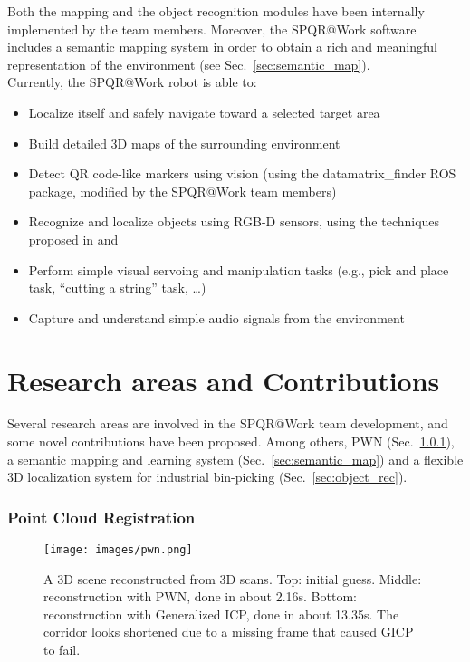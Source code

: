 \documentclass[conference]{IEEEtran}
\begin{document}
Both the mapping and the object recognition modules have been internally implemented by the team members.
Moreover, the SPQR@Work software includes a semantic mapping system in order to obtain a rich and meaningful representation of the environment (see Sec.~\ref{sec:semantic_map}).\\

Currently, the SPQR@Work robot is able to:

\begin{itemize}
 \item Localize itself and safely navigate toward a selected target area
 \item Build detailed 3D maps of the surrounding environment
 \item Detect QR code-like markers using vision (using the datamatrix\_finder ROS package, modified by the SPQR@Work team members)
 \item Recognize and localize objects using RGB-D sensors, using the techniques proposed in \cite{antonelloVISIGRAPP2014} and \cite{prettoCASE2013}
 \item Perform simple visual servoing and manipulation tasks (e.g., pick and place task, ``cutting a string'' task, \dots)
 \item Capture and understand simple audio signals from the environment
\end{itemize}

 
\section{Research areas and Contributions}\label{sec:research}

Several research areas are involved in the SPQR@Work team development, and some novel contributions have been proposed. Among others, PWN (Sec.~\ref{sec:pwn}), a semantic mapping and learning system (Sec.~\ref{sec:semantic_map}) and a flexible 3D localization system for industrial bin-picking (Sec.~\ref{sec:object_rec}).

\subsubsection{Point Cloud Registration}\label{sec:pwn}

\begin{figure}[t!]
\begin{center}
\texttt{[image: images/pwn.png]}
\end{center}
\caption{A 3D scene reconstructed from 3D scans. Top: initial guess. Middle: reconstruction with PWN, done in about 2.16s. Bottom: reconstruction with Generalized ICP, done in about 13.35s. The corridor looks shortened due to a missing frame that caused GICP to fail.}\label{fig:pwn}
\end{figure}
\end{document}
